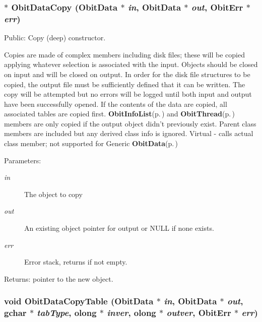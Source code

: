 \subsubsection{$\ast$ Obit\-Data\-Copy ({\bf Obit\-Data} $\ast$ {\em in}, {\bf Obit\-Data} $\ast$ {\em out}, {\bf Obit\-Err} $\ast$ {\em err})}\label{ObitData_8h_a34}


Public: Copy (deep) constructor. 

Copies are made of complex members including disk files; these will be copied applying whatever selection is associated with the input. Objects should be closed on input and will be closed on output. In order for the disk file structures to be copied, the output file must be sufficiently defined that it can be written. The copy will be attempted but no errors will be logged until both input and output have been successfully opened. If the contents of the data are copied, all associated tables are copied first. {\bf Obit\-Info\-List}{\rm (p.\,\pageref{structObitInfoList})} and {\bf Obit\-Thread}{\rm (p.\,\pageref{structObitThread})} members are only copied if the output object didn't previously exist. Parent class members are included but any derived class info is ignored. Virtual - calls actual class member; not supported for Generic {\bf Obit\-Data}{\rm (p.\,\pageref{structObitData})} \begin{Desc}
\item[Parameters:]
\begin{description}
\item[{\em in}]The object to copy \item[{\em out}]An existing object pointer for output or NULL if none exists. \item[{\em err}]Error stack, returns if not empty. \end{description}
\end{Desc}
\begin{Desc}
\item[Returns:]pointer to the new object. \end{Desc}
\subsubsection{\setlength{\rightskip}{0pt plus 5cm}void Obit\-Data\-Copy\-Table ({\bf Obit\-Data} $\ast$ {\em in}, {\bf Obit\-Data} $\ast$ {\em out}, gchar $\ast$ {\em tab\-Type}, {\bf olong} $\ast$ {\em inver}, {\bf olong} $\ast$ {\em outver}, {\bf Obit\-Err} $\ast$ {\em err})}\label{ObitData_8h_a46}


